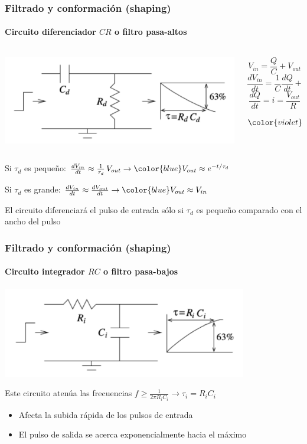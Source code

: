 \documentclass{beamer}
\begin{document}
\begin{frame}
\frametitle{Filtrado y conformación (shaping)}
\framesubtitle{{\color{blue}Circuito diferenciador $CR$ o filtro pasa-altos}}
\begin{columns}
\begin{column}{0.5\textwidth}
\begin{center}
\includegraphics[width=\textwidth]{d2/cr_differentiator2}
\end{center}
\end{column}
\begin{column}{0.5\textwidth}
$$V_{in} = \frac{Q}{C} + V_{out}$$
$$\frac{dV_{in}}{dt} = \frac{1}{C}\frac{dQ}{dt} + \frac{dV_{out}}{dt}$$
$$\frac{dQ}{dt} = i = \frac{V_{out}}{R}$$
$${\color{violet}\frac{dV_{in}}{dt} = \frac{1}{RC}V_{out} + \frac{dV_{out}}{dt}}$$
\end{column}
\end{columns}
\begin{alertblock}{}
Si $\tau_d$ es pequeño:
$\frac{dV_{in}}{dt} \approx \frac{1}{\tau_d}\,V_{out} \rightarrow
{\color{blue}V_{out} \approx e^{-t/\tau_d}}$

\vspace{2mm}
Si $\tau_d$ es grande:
$\frac{dV_{in}}{dt} \approx \frac{dV_{out}}{dt} \rightarrow {\color{blue}V_{out} \approx
V_{in}}$
\end{alertblock}
\alert{El circuito diferenciará el pulso de entrada sólo si $\tau_d$ es pequeño 
comparado con el ancho del pulso}
\end{frame}

\begin{frame}
\frametitle{Filtrado y conformación (shaping)}
\framesubtitle{{\color{blue}Circuito integrador $RC$ o filtro pasa-bajos}}
\begin{center}
\includegraphics[width=0.8\textwidth]{d2/rc_integrator2}
\end{center}
Este circuito atenúa las frecuencias $f \geq \frac{1}{2\pi R_iC_i} \rightarrow \tau_i = R_iC_i$
\begin{itemize}
\item \alert{Afecta la subida rápida de los pulsos de entrada}
\item \alert{El pulso de salida se acerca exponencialmente hacia el máximo}
\end{itemize}
\end{frame}
\end{document}

